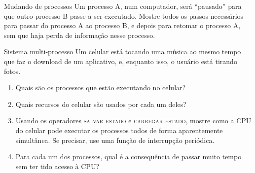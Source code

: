 \documentclass{beamer}
\begin{document}
\begin{frame}{Mudando de processos}
  \large
  Um processo A, num computador, será ``pausado'' para que outro
  processo B passe a ser executado. Mostre todos os passos necessários para
  passar do processo A ao processo B, e depois para retomar o processo A, sem
  que haja perda de informação nesse processo.
\end{frame}

\begin{frame}{Sistema multi-processo}
  \Large
  Um celular está tocando uma música ao mesmo tempo que faz o download de um
  aplicativo, e, enquanto isso, o usuário está tirando fotos.
  \begin{enumerate}
    \item Quais são os processos que estão executando no celular?
    \item Quais recursos do celular são usados por cada um deles?
    \item Usando os operadores \textsc{salvar estado} e \textsc{carregar
      estado}, mostre como a CPU do celular pode executar os processos todos de
      forma aparentemente simultânea. Se precisar, use uma função de interrupção
      periódica.
    \item Para cada um dos processos, qual é a consequência de passar muito tempo
      sem ter tido acesso à CPU?
  \end{enumerate}

\end{frame}
\end{document}
